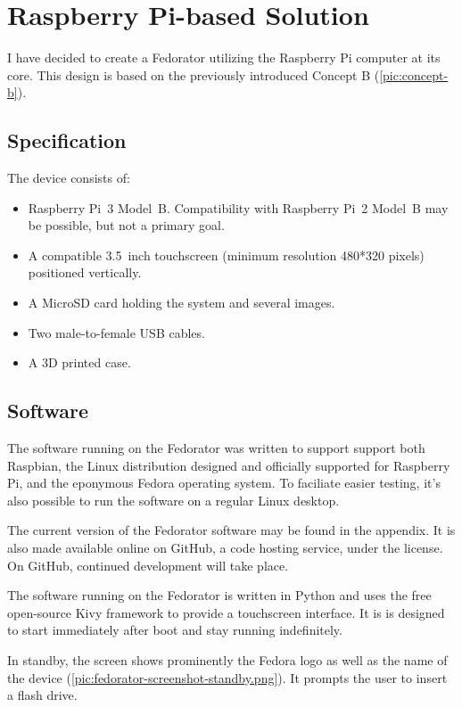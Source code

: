 \chapter{Raspberry Pi-based Solution}
    I have decided to create a Fedorator utilizing the Raspberry Pi computer at its core.  This design is based on the previously introduced Concept B (\ref{pic:concept-b}).
    \section{Specification}
        The device consists of:
        \begin{itemize}
            \item Raspberry Pi~3 Model~B.  Compatibility with Raspberry Pi~2 Model~B may be possible, but not a primary goal.
            \item A compatible 3.5~inch touchscreen (minimum resolution 480*320 pixels) positioned vertically.
            \item A MicroSD card holding the system and several images.
            \item Two male-to-female USB cables.
            \item A 3D printed case.
        \end{itemize}
    
    \section{Software}
        The software running on the Fedorator was written to support support both Raspbian, the Linux distribution designed and officially supported for Raspberry Pi\cite{raspian}, and the eponymous Fedora operating system.  To faciliate easier testing, it's also possible to run the software on a regular Linux desktop.
        
        The current version of the Fedorator software may be found in the appendix.  It is also made available online on GitHub, a code hosting service, under the  license\cite{fedorator-github}.  On GitHub, continued development will take place.
        
        The software running on the Fedorator is written in Python and uses the free open-source Kivy framework\cite{kivy} to provide a touchscreen interface.  It is is designed to start immediately after boot and stay running indefinitely.
        
        In standby, the screen shows prominently the Fedora logo as well as the name of the device (\ref{pic:fedorator-screenshot-standby.png}).  It prompts the user to insert a flash drive.
        
